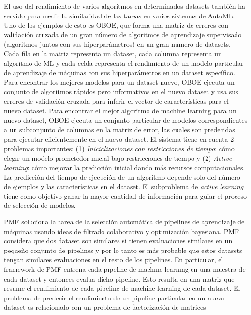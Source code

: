 El uso del rendimiento de varios algoritmos en determinados datasets también ha servido para medir la similaridad de las tareas en varios sistemas de AutoML. Uno de los ejemplos de esto es OBOE, que forma una matriz de errores con validación cruzada de un gran número de algoritmos de aprendizaje supervisado (algoritmos juntos con sus hiperparámetros) en un gran número de datasets. Cada fila  en la matriz representa un dataset, cada columna representa un algoritmo de ML y cada celda representa el rendimiento de un modelo particular de aprendizaje de máquinas con sus hiperparámetros en un dataset específico. Para encontrar los mejores modelos para un dataset nuevo, OBOE ejecuta un conjunto de algoritmos rápidos pero informativos en el nuevo dataset y usa sus errores de validación cruzada para inferir el vector de características para el nuevo dataset. Para encontrar el mejor algoritmo de machine learning para un nuevo dataset, OBOE ejecuta un conjunto particular de modelos correspondientes a un subconjunto de columnas en la matriz de error, las cuales son predecidas para ejecutar eficientemente en el nuevo dataset. El sistema tiene en cuenta 2 problemas importantes: (1) \textit{Inicializaciones con restricciones de tiempo}: cómo elegir un modelo prometedor inicial bajo restricciones de tiempo y (2) \textit{Active learning}: cómo mejorar la predicción inicial dando más recursos computacionales. La predicción del tiempo de ejecución de un algoritmo depende solo del número de ejemplos y las características en el dataset. El subproblema de \textit{active learning} tiene como objetivo ganar la mayor cantidad de información para guiar el proceso de selección de modelos.

PMF soluciona la tarea de la selección automática de pipelines de aprendizaje de máquinas usando ideas de filtrado colaborativo y optimización bayesiana. PMF considera que dos dataset son similares si tienen evaluaciones similares en un pequeño conjunto de pipelines y por lo tanto es más probable que estos datasets tengan similares evaluaciones en el resto de los pipelines. En particular, el framework de PMF entrena cada pipeline de machine learning en una muestra de cada dataset y entonces evalua dicho pipeline. Esto resulta en una matriz que resume el rendimiento de cada pipeline de machine learning de cada dataset. El problema de predecir el rendimiento de un pipeline particular en un nuevo dataset es relacionado con un problema de factorización de matrices.

